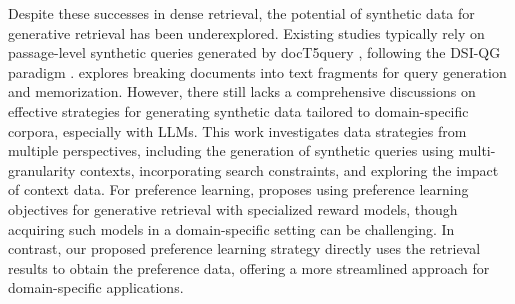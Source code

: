 Despite these successes in dense retrieval, the potential of synthetic data for generative retrieval has been underexplored.
Existing studies typically rely on passage-level synthetic queries generated by docT5query \cite{nogueiradoc2query}, following the DSI-QG paradigm \cite{DBLP:journals/corr/abs-2206-10128}.
\citet{chen-etal-2023-understanding} explores breaking documents into text fragments for query generation and memorization. However, there still lacks a comprehensive discussions on effective strategies for generating synthetic data tailored to domain-specific corpora, especially with LLMs.
This work investigates data strategies from multiple perspectives, including the generation of synthetic queries using multi-granularity contexts, incorporating search constraints, and exploring the impact of context data. For preference learning, \citet{zhou-etal-2023-enhancing-generative} proposes using preference learning objectives for generative retrieval with specialized reward models, though acquiring such models in a domain-specific setting can be challenging.
In contrast, our proposed preference learning strategy directly uses the retrieval results to obtain the preference data, offering a more streamlined approach for domain-specific applications.
